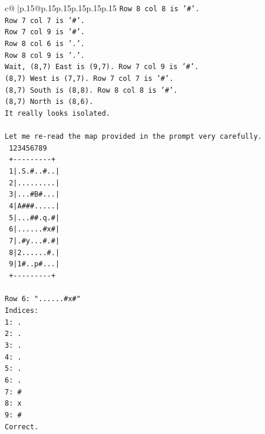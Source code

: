 \documentclass{article}
\begin{document}
{\begin{supertabular}{c@{$\;$}|p{.15\linewidth}@{}p{.15\linewidth}p{.15\linewidth}p{.15\linewidth}p{.15\linewidth}p{.15\linewidth}}
{{{\texttt{Row 8 col 8 is '\#'.} \\
\texttt{Row 7 col 7 is '\#'.} \\
\texttt{Row 7 col 9 is '\#'.} \\
\texttt{Row 8 col 6 is '.'.} \\
\texttt{Row 8 col 9 is '.'.} \\
\texttt{Wait, (8,7) East is (9,7). Row 7 col 9 is '\#'.} \\
\texttt{(8,7) West is (7,7). Row 7 col 7 is '\#'.} \\
\texttt{(8,7) South is (8,8). Row 8 col 8 is '\#'.} \\
\texttt{(8,7) North is (8,6).} \\
\texttt{It really looks isolated.} \\
\\ 
\texttt{Let me re{-}read the map provided in the prompt very carefully.} \\
\texttt{   123456789} \\
\texttt{  +{-}{-}{-}{-}{-}{-}{-}{-}{-}+} \\
\texttt{ 1|.S.\#..\#..|} \\
\texttt{ 2|.........|} \\
\texttt{ 3|...\#B\#...|} \\
\texttt{ 4|A\#\#\#.....|} \\
\texttt{ 5|...\#\#.q.\#|} \\
\texttt{ 6|......\#x\#|} \\
\texttt{ 7|.\#y...\#.\#|} \\
\texttt{ 8|2......\#.|} \\
\texttt{ 9|1\#..p\#...|} \\
\texttt{  +{-}{-}{-}{-}{-}{-}{-}{-}{-}+} \\
\\ 
\texttt{Row 6: "......\#x\#"} \\
\texttt{Indices:} \\
\texttt{1: .} \\
\texttt{2: .} \\
\texttt{3: .} \\
\texttt{4: .} \\
\texttt{5: .} \\
\texttt{6: .} \\
\texttt{7: \#} \\
\texttt{8: x} \\
\texttt{9: \#} \\
\texttt{Correct.} \\
\\ 
}}}
\end{supertabular}}
\end{document}
